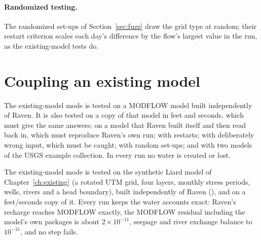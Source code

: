 \paragraph{Randomized testing.} The randomized set-ups of Section~\ref{sec:fuzz} draw the grid type at random; their
restart criterion scales each day's difference by the flow's largest value in the run, as the existing-model tests do.

\section{Coupling an existing model}\label{sec:vexisting}
\begin{plain}
The existing-model mode is tested on a MODFLOW model built independently of Raven. It is also tested on a copy of that
model in feet and seconds, which must give the same answers; on a model that Raven built itself and then read back in, which
must reproduce Raven's own run; with restarts; with deliberately wrong input, which must be caught; with random set-ups;
and with two models of the USGS example collection. In every run no water is created or lost.
\end{plain}
The existing-model mode is tested on the synthetic Liard model of Chapter~\ref{ch:existing} (a rotated UTM grid, four
layers, monthly stress periods, wells, rivers and a head boundary), built independently of Raven
(), and on a feet/seconds copy of it. Every run keeps the water accounts exact:
Raven's recharge reaches MODFLOW exactly, the MODFLOW residual including the model's own packages is about
$2\times10^{-11}$, seepage and river exchange balance to $10^{-11}$, and no step fails.

